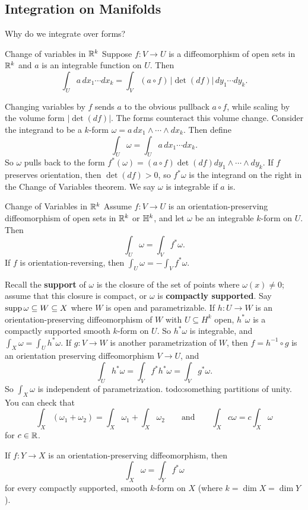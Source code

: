 \subsection{Integration on Manifolds}
Why do we integrate over forms? 
\begin{namedthm}{Change of variables in $\mathbb{R}^k$} 
   Suppose $f \colon V \to U$ is a diffeomorphism of open sets in $\mathbb{R}^k$ and $a$ is an integrable function on $U$. Then \[
       \int_{U} a\, dx_1 \cdots  dx_k = \int _V (a \circ f) \,|\det (df)|\, dy_1 \cdots dy_k.
   \] 
\end{namedthm}
Changing variables by $f$ sends $a$ to the obvious pullback $a \circ f$, while scaling by the volume form $|\det (df)|$. The forms counteract this volume change. Consider the integrand to be a $k$-form $\omega= a\,dx_1\wedge \cdots \wedge dx_k$. Then define \[
\int_U \omega= \int_U a\,dx_1 \cdots dx_k.
\] So $\omega$ pulls back to the form $f^*(\omega)= (a \circ f) \det (df) dy_1 \wedge  \cdots \wedge  dy_k$. If $f$ preserves orientation, then $\det(df)>0$, so $f^* \omega$ is the integrand on the right in the Change of Variables theorem. We say $\omega$ is integrable if $a$ is.
\begin{namedthm}{Change of Variables in $\mathbb{R}^k$} 
   Assume $f \colon V \to U$ is an orientation-preserving diffeomorphism of open sets in $\mathbb{R}^k$ or $\mathbb{H}^k$, and let $\omega$ be an integrable $k$-form on $U$. Then \[
   \int _U \omega= \int_V f^* \omega.  
   \] If $f$ is orientation-reversing, then $\int_U \omega=-\int _V f^* \omega$.
\end{namedthm}
Recall the \textbf{support} of $\omega$ is the closure of the set of points where $\omega(x)\neq 0$; assume that this closure is compact, or $\omega$ is \textbf{compactly supported}. Say $\operatorname{supp} \omega \subseteq W \subseteq X$ where $W$ is open and parametrizable. If $h \colon U \to W$ is an orientation-preserving diffeomorphism of $W$ with $U \subseteq H^k$ open, $h^* \omega$ is a compactly supported smooth $k$-form on $U$. So $h^* \omega$ is integrable, and $\int_X\omega= \int_U h^* \omega$. If $g \colon V \to W$ is another parametrization of $W$, then $f = h ^{-1} \circ g$ is an orientation preserving diffeomorphism $V \to U$, and \[
\int _U  h^* \omega  = \int _V f^* h^* \omega=\int _V g^* \omega.
\] So $\int_X \omega$ is independent of parametrization. {\color{red}todo:something partitions of unity}. You can check that \[
\int_X (\omega_1+\omega_2)= \int _X \omega_1+ \int_X \omega_2 \qquad \text{and} \qquad \int_X c\omega=c \int_X \omega
\] for $c \in \mathbb{R}$.
\begin{theorem}
    If $f \colon Y \to X$ is an orientation-preserving diffeomorphism, then \[
    \int_X \omega=\int_Y f^* \omega
\] for every compactly supported, smooth $k$-form on $X$ (where $k=\dim X=\dim Y$).
\end{theorem}

